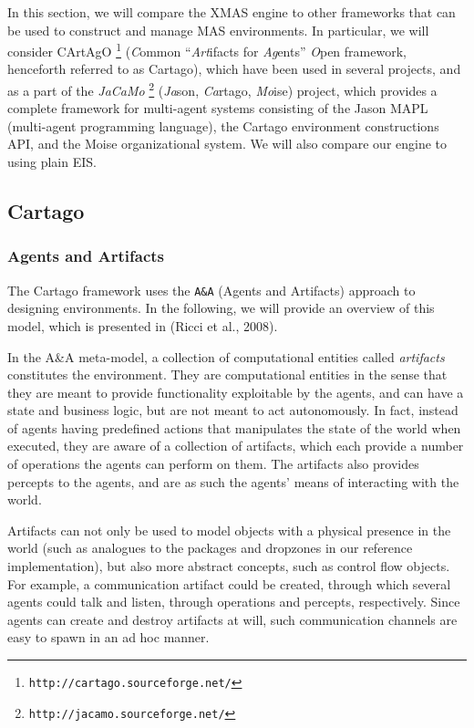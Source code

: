 In this section, we will compare the XMAS engine to other frameworks
that can be used to construct and manage MAS environments. In particular,
we will consider CArtAgO%
\footnote{\texttt{http://cartago.sourceforge.net/}%
} (\emph{C}ommon ``\emph{Art}ifacts for \emph{Ag}ents'' \emph{O}pen
framework, henceforth referred to as Cartago), which have been used
in several projects, and as a part of the \emph{JaCaMo}%
\footnote{\texttt{http://jacamo.sourceforge.net/}%
} (\emph{Ja}son, \emph{Ca}rtago, \emph{Mo}ise) project, which provides
a complete framework for multi-agent systems consisting of the Jason
MAPL (multi-agent programming language), the Cartago environment constructions
API, and the Moise organizational system. We will also compare our
engine to using plain EIS.


\subsection{Cartago}


\subsubsection*{Agents and Artifacts}

The Cartago framework uses the \texttt{A\&A} (Agents and Artifacts)
approach to designing environments. In the following, we will provide
an overview of this model, which is presented in (Ricci et al., 2008).

In the A\&A meta-model, a collection of computational entities called
\emph{artifacts} constitutes the environment. They are computational
entities in the sense that they are meant to provide functionality
exploitable by the agents, and can have a state and business logic,
but are not meant to act autonomously. In fact, instead of agents
having predefined actions that manipulates the state of the world
when executed, they are aware of a collection of artifacts, which
each provide a number of operations the agents can perform on them.
The artifacts also provides percepts to the agents, and are as such
the agents' means of interacting with the world. 

Artifacts can not only be used to model objects with a physical presence
in the world (such as analogues to the packages and dropzones in our
reference implementation), but also more abstract concepts, such as
control flow objects. For example, a communication artifact could
be created, through which several agents could talk and listen, through
operations and percepts, respectively. Since agents can create and
destroy artifacts at will, such communication channels are easy to
spawn in an ad hoc manner.

